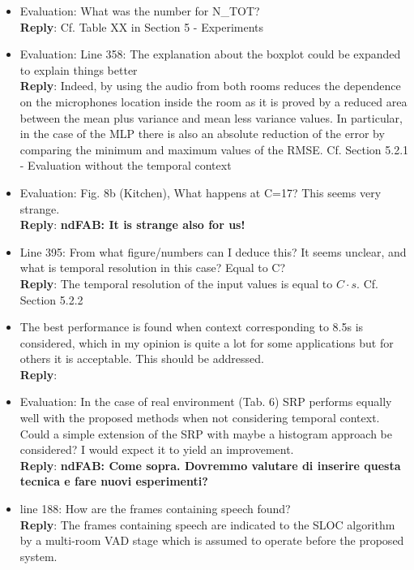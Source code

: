 \documentclass[11pt, technote, letterpaper, oneside, onecolumn]{IEEEtran}
\begin{document}
\begin{itemize}
\item Evaluation: What was the number for N\_TOT?\\
\textbf{Reply}: Cf. Table XX in Section 5 - Experiments

\item Evaluation: Line 358: The explanation about the boxplot could be expanded to explain things better\\
\textbf{Reply}: Indeed, by using the audio from both rooms reduces the dependence on the microphones location inside the room as it is proved by a reduced area between the mean plus variance and mean less variance values. In particular, in the case of the MLP there is also an absolute reduction of the error by comparing the minimum and maximum values of the RMSE. Cf. Section 5.2.1 - Evaluation without the temporal context

\item Evaluation: Fig. 8b (Kitchen), What happens at C=17? This seems very strange.\\
\textbf{Reply}: \textbf{ndFAB: It is strange also for us!}

\item Line 395: From what figure/numbers can I deduce this? It seems unclear, and what is temporal resolution in this case? Equal to C?\\
\textbf{Reply}: The temporal resolution of the input values is equal to $C\cdot s$. Cf. Section 5.2.2 

\item The best performance is found when context corresponding to 8.5s is considered, which in my opinion is quite a lot for some applications but for others it is acceptable. This should be addressed.\\
\textbf{Reply}:

\item Evaluation: In the case of real environment (Tab. 6) SRP performs equally well with the proposed methods when not considering temporal context. Could a simple extension of the SRP with maybe a histogram approach be considered? I would expect it to yield an improvement.\\
\textbf{Reply}: \textbf{ndFAB: Come sopra. Dovremmo valutare di inserire questa tecnica e fare nuovi esperimenti?}

\item line 188: How are the frames containing speech found?\\
\textbf{Reply}: The frames containing speech are indicated to the SLOC algorithm by a multi-room VAD stage which is assumed to operate before the proposed system.


\end{itemize}
\end{document}
